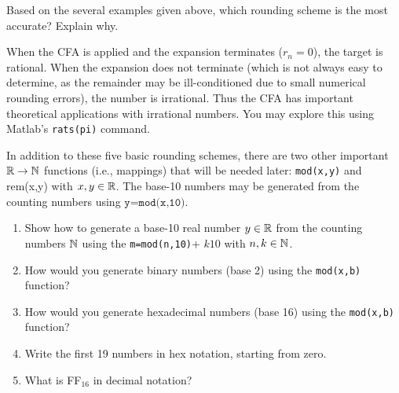 \documentclass{ximera}
\begin{document}
\BEx %
Based on the several examples given above, which rounding scheme is the most accurate? Explain why. 

\EEx

When the CFA is applied and the expansion terminates ($r_n=0$), the target is rational. 
When the expansion does not terminate (which is not always easy to determine, as the remainder may be
ill-conditioned due to small numerical rounding errors), the number is irrational.
Thus the CFA has important theoretical applications with irrational numbers.
You may explore this using Matlab's \texttt{rats(pi)} command. 

In addition to these five basic rounding schemes, there are two other important $\mathbb{R} \to \mathbb{N}$ functions
(i.e., mappings) that will be needed later: \texttt{mod(x,y)} and {rem(x,y)} with $x,y \in\mathbb{R}$.
  
The base-10 numbers may be generated from the counting numbers using $\texttt{y=mod(x,10)}$.

\BEx
\begin{enumerate}
\item Show how to generate a base-10 real number $y\in\mathbb{R}$ from the counting numbers $\mathbb{N}$
using the \texttt{m=mod(n,10)}+ $k10$ with $n,k\in\mathbb{N}$.


\item How would you generate binary numbers (base 2) using the \texttt{mod(x,b)} function?

\item How would you generate hexadecimal numbers (base 16) using the \texttt{mod(x,b)} function?

\item Write the first 19 numbers in hex notation, starting from zero.

\item What is FF$_{16}$ in decimal notation?
\end{enumerate}
\EEx
\end{document}
